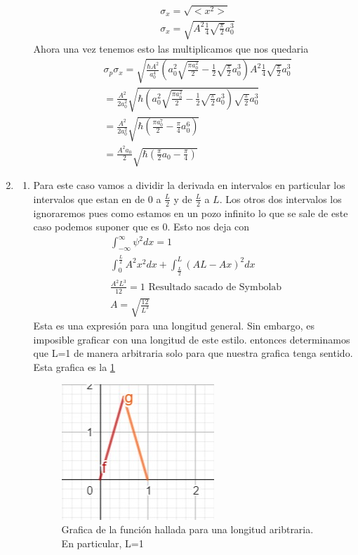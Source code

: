 \documentclass[12pt]{exam}
\begin{document}
\begin{enumerate}
\begin{enumerate}
\begin{align*}
				&\sigma_x = \sqrt{<x^2>}\\
				&\sigma_x = \sqrt{A^2\frac{1}{4}\sqrt{\frac{\pi}{2}}a_0^3}
			\end{align*}
			Ahora una vez tenemos esto las multiplicamos que nos quedaria
			\begin{align*}
				&\sigma_p\sigma_x = \sqrt{\frac{\hbar A^2}{a_0^4} \left(a_0^2\sqrt{\frac{\pi a_0^2}{2}}-\frac{1}{2}\sqrt{\frac{\pi}{2}}a_0^3\right)A^2\frac{1}{4}\sqrt{\frac{\pi}{2}}a_0^3}\\
				&=\frac{A^2}{2a_0^2}\sqrt{\hbar \left(a_0^2\sqrt{\frac{\pi a_0^2}{2}}-\frac{1}{2}\sqrt{\frac{\pi}{2}}a_0^3\right)\sqrt{\frac{\pi}{2}}a_0^3}\\
				&=\frac{A^2}{2a_0^2}\sqrt{\hbar \left(\frac{\pi a_0^7}{2}-\frac{\pi}{4}a_0^6\right)}\\
				&=\frac{A^2a_0}{2}\sqrt{\hbar \left(\frac{\pi}{2}a_0-\frac{\pi}{4}\right)}
			\end{align*}
	\end{enumerate}
\item \begin{enumerate}
\item Para este caso vamos a dividir la derivada en intervalos en particular los intervalos que estan en de $0$ a $\frac{L}{2}$ y de $\frac{L}{2}$ a $L$. Los otros dos intervalos los ignoraremos pues como estamos en un pozo infinito lo que se sale de este caso podemos suponer que es 0. Esto nos deja con
	\begin{align*}
		&\int_{-\infty}^{\infty} \psi^2 dx = 1\\
		&\int_{0}^{\frac{L}{2}} A^2x^2 dx + \int_{\frac{L}{2}}^L (AL-Ax)^2 dx\\
		&\frac{A^2L^3}{12} = 1 \text{ Resultado sacado de Symbolab }\\
		&A = \sqrt{\frac{12}{L^3}}
	\end{align*}
	Esta es una expresión para una longitud general. Sin embargo, es imposible graficar con una longitud de este estilo. entonces determinamos que L=1 de manera arbitraria solo para que nuestra grafica tenga sentido. Esta grafica es la \ref{fig:Graf}
	\begin{figure}[h]
		\centering
		\includegraphics[scale=0.9]{Graf.jpeg}
		\caption{Grafica de la función hallada para una longitud aribtraria. En particular, L=1}
		\label{fig:Graf}
	\end{figure}


\end{enumerate}
\end{enumerate}
\end{document}
